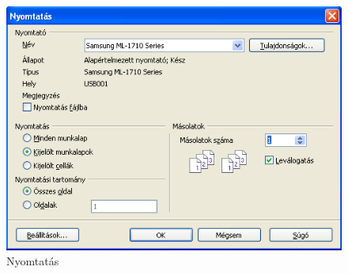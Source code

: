 \begin{figure}[!h]
\begin{center}
\includegraphics[width=12.52cm]{oocalcv1-img169.png}
\caption{Nyomtatás}\label{Nyomtatás}
\end{center}
\end{figure}

